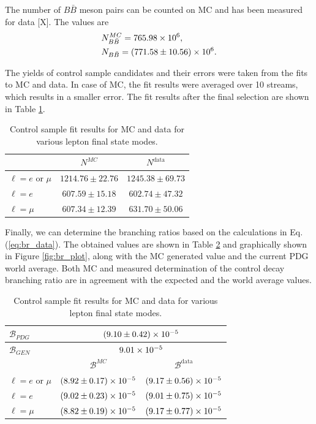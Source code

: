 The number of $B\bar B$ meson pairs can be counted on MC and has been measured for data [X]. The values are
\begin{align*}
&N_{B\bar B}^{MC} = 765.98\times 10^{6},\\
&N_{B\bar B} = (771.58 \pm 10.56)\times 10^{6}.
\end{align*}

The yields of control sample candidates and their errors were taken from the fits to MC and data. In case of MC, the fit results were averaged over 10 streams, which results in a smaller error. The fit results after the final selection are shown in Table \ref{tab:fit_yield}.

\begin{table}[H]
	\centering
	\begin{tabular}{|l|c|c|}
\hline
 & $N^{MC}$ & $N^{\mathrm{data}}$ \\
\hline
$\ell = e$ or $\mu$ & $1214.76 \pm 22.76$ & $1245.38 \pm 69.73$\\
	\hline
$\ell = e$ & $607.59 \pm 15.18$ & $602.74 \pm 47.32$ \\
\hline
$\ell = \mu$ & $607.34 \pm 12.39$ & $631.70 \pm 50.06$\\
	\hline
\end{tabular}
\caption{Control sample fit results for MC and data for various lepton final state modes.}
\label{tab:fit_yield}
\end{table}

Finally, we can determine the branching ratios based on the calculations in Eq. (\ref{eq:br_data}). The obtained values are shown in Table \ref{tab:br_result} and graphically shown in Figure \ref{fig:br_plot}, along with the MC generated value and the current PDG world average. Both MC and measured determination of the control decay branching ratio are in agreement with the expected and the world average values.

\begin{table}[H]
	\centering
	\begin{tabular}{|l|c|c|}
		\hline
		$\mathcal{B}_{PDG}$ & \multicolumn{2}{c|}{$(9.10\pm0.42)\times 10^{-5}$} \\
		\hline
     	$\mathcal{B}_{GEN}$ & \multicolumn{2}{c|}{$9.01\times 10^{-5}$} \\
     	\hline
		& $\mathcal{B}^{MC}$ & $\mathcal{B}^{\mathrm{data}}$ \\
		\hline
		$\ell = e$ or $\mu$ & $(8.92\pm0.17)\times 10^{-5}$ & $(9.17\pm0.56)\times 10^{-5}$\\
		\hline
		$\ell = e$ & $(9.02\pm0.23)\times 10^{-5}$ & $(9.01\pm0.75)\times 10^{-5}$ \\
		\hline
		$\ell = \mu$ & $(8.82\pm0.19)\times 10^{-5}$ & $(9.17\pm0.77)\times 10^{-5}$\\
		\hline
	\end{tabular}
	\caption{Control sample fit results for MC and data for various lepton final state modes.}
	\label{tab:br_result}
\end{table}

